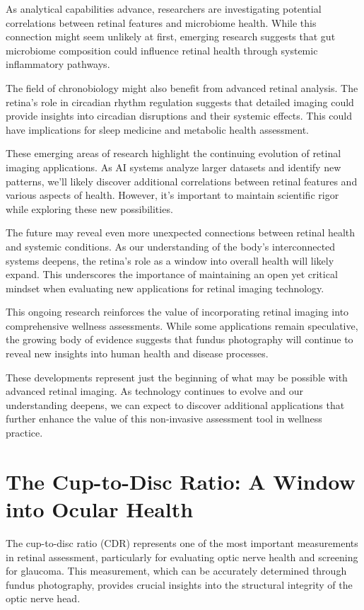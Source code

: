 \documentclass[
  Letterpaper,
]{scrbook}
\begin{document}
As analytical capabilities advance, researchers are investigating
potential correlations between retinal features and microbiome health.
While this connection might seem unlikely at first, emerging research
suggests that gut microbiome composition could influence retinal health
through systemic inflammatory pathways.

The field of chronobiology might also benefit from advanced retinal
analysis. The retina's role in circadian rhythm regulation suggests that
detailed imaging could provide insights into circadian disruptions and
their systemic effects. This could have implications for sleep medicine
and metabolic health assessment.

These emerging areas of research highlight the continuing evolution of
retinal imaging applications. As AI systems analyze larger datasets and
identify new patterns, we'll likely discover additional correlations
between retinal features and various aspects of health. However, it's
important to maintain scientific rigor while exploring these new
possibilities.

The future may reveal even more unexpected connections between retinal
health and systemic conditions. As our understanding of the body's
interconnected systems deepens, the retina's role as a window into
overall health will likely expand. This underscores the importance of
maintaining an open yet critical mindset when evaluating new
applications for retinal imaging technology.

This ongoing research reinforces the value of incorporating retinal
imaging into comprehensive wellness assessments. While some applications
remain speculative, the growing body of evidence suggests that fundus
photography will continue to reveal new insights into human health and
disease processes.

These developments represent just the beginning of what may be possible
with advanced retinal imaging. As technology continues to evolve and our
understanding deepens, we can expect to discover additional applications
that further enhance the value of this non-invasive assessment tool in
wellness practice.

\section{The Cup-to-Disc Ratio: A Window into Ocular
Health}\label{the-cup-to-disc-ratio-a-window-into-ocular-health}

The cup-to-disc ratio (CDR) represents one of the most important
measurements in retinal assessment, particularly for evaluating optic
nerve health and screening for glaucoma. This measurement, which can be
accurately determined through fundus photography, provides crucial
insights into the structural integrity of the optic nerve head.
\end{document}
